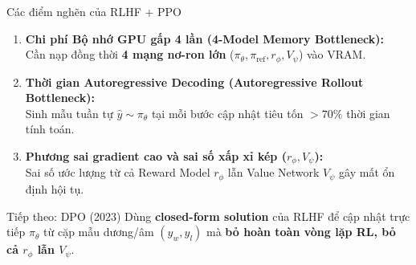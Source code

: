 \begin{frame}{Các điểm nghẽn của RLHF + PPO}
  \small
  \begin{enumerate}\setlength{\itemsep}{4pt}
    \item \textbf{Chi phí Bộ nhớ GPU gấp 4 lần (4-Model Memory Bottleneck):}\\
      \small Cần nạp đồng thời \textbf{4 mạng nơ-ron lớn} ($\pi_\theta, \pi_{\text{ref}}, r_\phi, V_\psi$) vào VRAM.
    \item \textbf{Thời gian Autoregressive Decoding (Autoregressive Rollout Bottleneck):}\\
      \small Sinh mẫu tuần tự $\hat{y} \sim \pi_\theta$ tại mỗi bước cập nhật tiêu tốn $>70\%$ thời gian tính toán.
    \item \textbf{Phương sai gradient cao và sai số xấp xỉ kép ($r_\phi, V_\psi$):}\\
      \small Sai số ước lượng từ cả Reward Model $r_\phi$ lẫn Value Network $V_\psi$ gây mất ổn định hội tụ.
  \end{enumerate}

  \vspace{0.06cm}
  \begin{exampleblock}{Tiếp theo: DPO (2023)}
    \small
    Dùng \textbf{closed-form solution} của RLHF để cập nhật trực tiếp $\pi_\theta$ từ cặp mẫu dương/âm $(y_w, y_l)$ mà \textbf{bỏ hoàn toàn vòng lặp RL, bỏ cả $r_\phi$ lẫn $V_\psi$}.
  \end{exampleblock}
  \par\vspace{0pt}
\end{frame}
